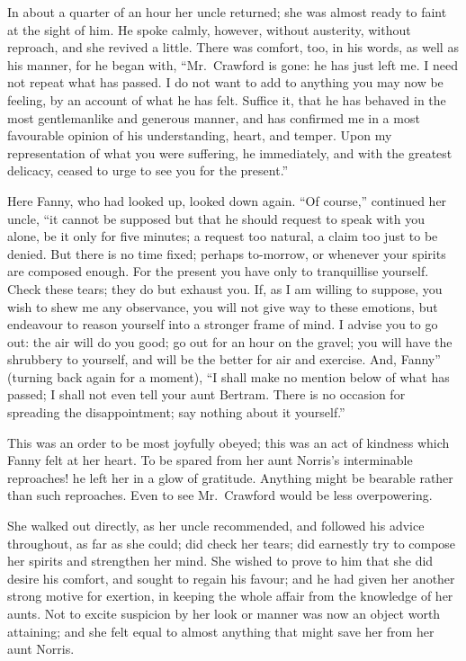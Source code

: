 In about a quarter of an hour her uncle returned;
she was almost ready to faint at the sight of him.
He spoke calmly, however, without austerity, without reproach,
and she revived a little.  There was comfort, too,
in his words, as well as his manner, for he began with,
``Mr.\ Crawford is gone:  he has just left me.  I need not
repeat what has passed.  I do not want to add to anything
you may now be feeling, by an account of what he has felt.
Suffice it, that he has behaved in the most gentlemanlike
and generous manner, and has confirmed me in a most
favourable opinion of his understanding, heart, and temper.
Upon my representation of what you were suffering,
he immediately, and with the greatest delicacy,
ceased to urge to see you for the present.''

Here Fanny, who had looked up, looked down again.  ``Of course,''
continued her uncle, ``it cannot be supposed but that he should
request to speak with you alone, be it only for five minutes;
a request too natural, a claim too just to be denied.
But there is no time fixed; perhaps to-morrow, or whenever
your spirits are composed enough.  For the present you
have only to tranquillise yourself.  Check these tears;
they do but exhaust you.  If, as I am willing to suppose,
you wish to shew me any observance, you will not give
way to these emotions, but endeavour to reason yourself
into a stronger frame of mind.  I advise you to go out:
the air will do you good; go out for an hour on the gravel;
you will have the shrubbery to yourself, and will be the
better for air and exercise.  And, Fanny'' (turning back
again for a moment), ``I shall make no mention below of
what has passed; I shall not even tell your aunt Bertram.
There is no occasion for spreading the disappointment;
say nothing about it yourself.''

This was an order to be most joyfully obeyed; this was
an act of kindness which Fanny felt at her heart.
To be spared from her aunt Norris's interminable
reproaches! he left her in a glow of gratitude.
Anything might be bearable rather than such reproaches.
Even to see Mr.\ Crawford would be less overpowering.

She walked out directly, as her uncle recommended,
and followed his advice throughout, as far as she could;
did check her tears; did earnestly try to compose her spirits
and strengthen her mind.  She wished to prove to him that she
did desire his comfort, and sought to regain his favour;
and he had given her another strong motive for exertion,
in keeping the whole affair from the knowledge of her aunts.
Not to excite suspicion by her look or manner was now
an object worth attaining; and she felt equal to almost
anything that might save her from her aunt Norris.

